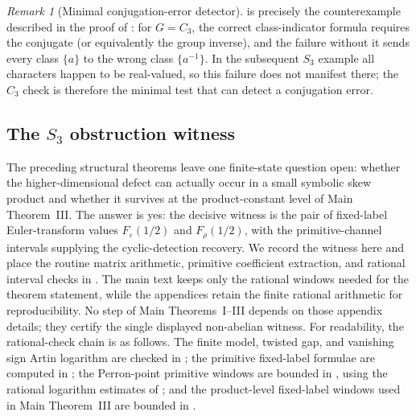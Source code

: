 \documentclass[11pt,a4paper]{amsart}
\theoremstyle{plain}
\theoremstyle{definition}
\theoremstyle{remark}
\newtheorem{remark}[theorem]{Remark}
\begin{document}
\begin{remark}[Minimal conjugation-error detector]
  \label{rem:minimal-conjugation-error-detector}
   is precisely the counterexample
  described in the proof of : for
  \(G=C_3\), the correct class-indicator formula requires the conjugate
  (or equivalently the group inverse), and the failure without it sends
  every class \(\{a\}\) to the wrong class \(\{a^{-1}\}\). In the
  subsequent \(S_3\) example all characters happen to be real-valued,
  so this failure does not manifest there; the \(C_3\) check is therefore
  the minimal test that can detect a conjugation error.
\end{remark}



\subsection{The \texorpdfstring{$S_3$}{S3} obstruction witness}
\label{subsec:s3-obstruction-certificate}

The preceding structural theorems leave one finite-state question open:
whether the higher-dimensional defect can actually occur in a small
symbolic skew product and whether it survives at the product-constant
level of Main Theorem~III.  The answer is yes: the decisive witness is
the pair of fixed-label Euler-transform values
\(F_\varepsilon(1/2)\) and \(F_\rho(1/2)\), with the primitive-channel
intervals supplying the cyclic-detection recovery.  We record the witness
here and place the routine matrix arithmetic, primitive coefficient
extraction, and rational interval checks in
.
The main text keeps only the rational windows needed for the theorem
statement, while the appendices retain the finite rational arithmetic for
reproducibility.  No step of Main Theorems~I--III depends on those appendix
details; they certify the single displayed non-abelian witness.  For
readability, the rational-check chain is as follows.  The finite model,
twisted gap, and vanishing sign Artin logarithm are checked in
; the primitive fixed-label formulae are
computed in ; the Perron-point
primitive windows are bounded in ,
using the rational logarithm estimates of
; and the product-level
fixed-label windows used in Main Theorem~III are bounded in
.
\end{document}
